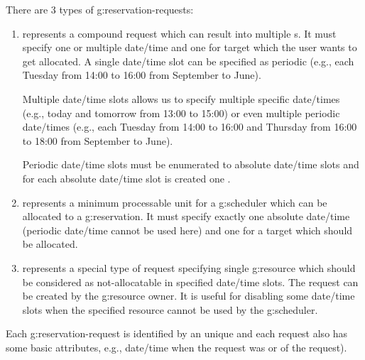 There are 3 types of \glspl{g:reservation-request}:
\begin{enumerate}
\item {} represents a compound request which can result into multiple s. It must specify one or multiple date/time  and one  for target which the user wants to get allocated. A single date/time slot can be specified as periodic (e.g., each Tuesday from 14:00 to 16:00 from September to June). 

Multiple date/time slots allows us to specify multiple specific date/times (e.g., today and tomorrow from 13:00 to 15:00) or even multiple periodic date/times (e.g., each Tuesday from 14:00 to 16:00 and Thursday from 16:00 to 18:00 from September to June).

Periodic date/time slots must be enumerated to absolute date/time slots and for each absolute date/time slot is created one .

\item {} represents a minimum processable unit for a \gls{g:scheduler} which can be allocated to a \gls{g:reservation}. It must specify exactly one absolute date/time  (periodic date/time cannot be used here) and one  for a target which should be allocated.

\item {} represents a special type of request specifying single \gls{g:resource} which should be considered as not-allocatable in specified date/time slots. The request can be created by the \gls{g:resource} owner. It is useful for disabling some date/time slots when the specified resource cannot be used by the \gls{g:scheduler}.
\end{enumerate}
Each \gls{g:reservation-request} is identified by an unique  and each request also has some basic attributes, e.g., date/time when the request was  or  of the request).


